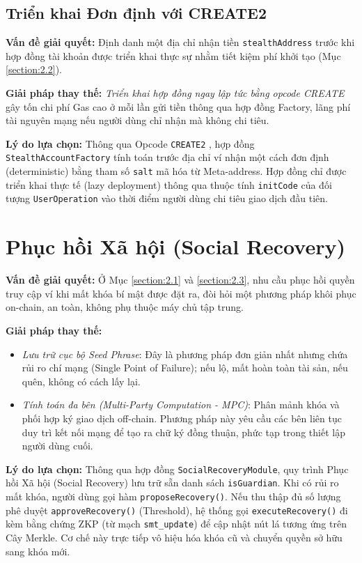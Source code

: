 \documentclass[../DoAn.tex]{subfiles}
\begin{document}
\subsection{Triển khai Đơn định với CREATE2}
\textbf{Vấn đề giải quyết:} Định danh một địa chỉ nhận tiền \texttt{stealthAddress} trước khi hợp đồng tài khoản được triển khai thực sự nhằm tiết kiệm phí khởi tạo (Mục \ref{section:2.2}).

\textbf{Giải pháp thay thế:} \textit{Triển khai hợp đồng ngay lập tức bằng opcode CREATE} gây tốn chi phí Gas cao ở mỗi lần gửi tiền thông qua hợp đồng Factory, lãng phí tài nguyên mạng nếu người dùng chỉ nhận mà không chi tiêu.

\textbf{Lý do lựa chọn:} Thông qua Opcode \texttt{CREATE2} \cite{eip1014}, hợp đồng \texttt{StealthAccountFactory} tính toán trước địa chỉ ví nhận một cách đơn định (deterministic) bằng tham số \texttt{salt} mã hóa từ Meta-address. Hợp đồng chỉ được triển khai thực tế (lazy deployment) thông qua thuộc tính \texttt{initCode} của đối tượng \texttt{UserOperation} vào thời điểm người dùng chi tiêu giao dịch đầu tiên.

\section{Phục hồi Xã hội (Social Recovery)}
\label{sec:3.4}
\textbf{Vấn đề giải quyết:} Ở Mục \ref{section:2.1} và \ref{section:2.3}, nhu cầu phục hồi quyền truy cập ví khi mất khóa bí mật được đặt ra, đòi hỏi một phương pháp khôi phục on-chain, an toàn, không phụ thuộc máy chủ tập trung.

\textbf{Giải pháp thay thế:}
\begin{itemize}
    \item \textit{Lưu trữ cục bộ Seed Phrase}: Đây là phương pháp đơn giản nhất nhưng chứa rủi ro chí mạng (Single Point of Failure); nếu lộ, mất hoàn toàn tài sản, nếu quên, không có cách lấy lại.
    \item \textit{Tính toán đa bên (Multi-Party Computation - MPC)}: Phân mảnh khóa và phối hợp ký giao dịch off-chain. Phương pháp này yêu cầu các bên liên tục duy trì kết nối mạng để tạo ra chữ ký đồng thuận, phức tạp trong thiết lập người dùng cuối.
\end{itemize}

\textbf{Lý do lựa chọn:} Thông qua hợp đồng \texttt{SocialRecoveryModule}, quy trình Phục hồi Xã hội (Social Recovery) lưu trữ sẵn danh sách \texttt{isGuardian}. Khi có rủi ro mất khóa, người dùng gọi hàm \texttt{proposeRecovery()}. Nếu thu thập đủ số lượng phê duyệt \texttt{approveRecovery()} (Threshold), hệ thống gọi \texttt{executeRecovery()} đi kèm bằng chứng ZKP (từ mạch \texttt{smt\_update}) để cập nhật nút lá tương ứng trên Cây Merkle. Cơ chế này trực tiếp vô hiệu hóa khóa cũ và chuyển quyền sở hữu sang khóa mới.
\end{document}

